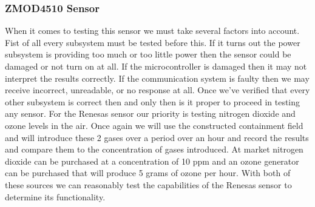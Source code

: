 \subsubsection{ZMOD4510 Sensor}
When it comes to testing this sensor we must take several factors into account. Fist of all every subsystem must be tested before this. If it turns out the power subsystem is providing too much or too little power then the sensor could be damaged or not turn on at all. If the microcontroller is damaged then it may not interpret the results correctly. If the communication system is faulty then we may receive incorrect, unreadable, or no response at all. Once we've verified that every other subsystem is correct then and only then is it proper to proceed in testing any sensor.
For the Renesas sensor our priority is testing nitrogen dioxide and ozone levels in the air. Once again we will use the constructed containment field and will introduce these 2 gases over a period over an hour and record the results and compare them to the concentration of gases introduced. At market nitrogen dioxide can be purchased at a concentration of 10 ppm and an ozone generator can be purchased that will produce 5 grams of ozone per hour. With both of these sources we can reasonably test the capabilities of the Renesas sensor to determine its functionality.

